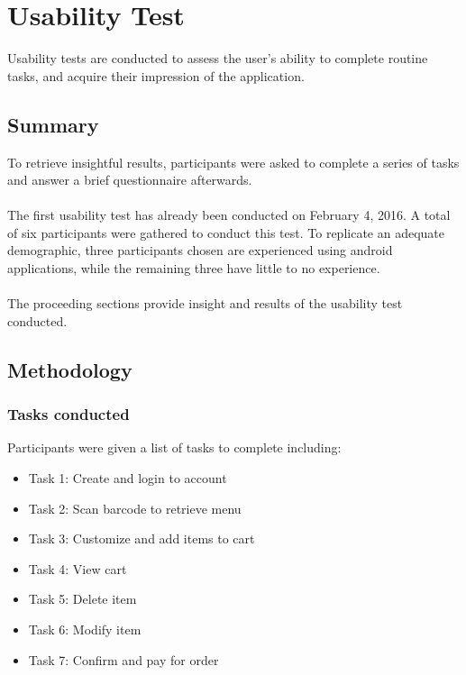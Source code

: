 \documentclass[12pt, titlepage]{article}
\begin{document}
\section{Usability Test}
\label{sec:Usability}
Usability tests are conducted to assess the user's ability to complete routine tasks, and acquire their impression of the application.
\subsection{Summary}

To retrieve insightful results, participants were asked to complete a series of tasks and answer a brief questionnaire afterwards. 
\\\\
The first usability test has already been conducted on February 4, 2016. A total of six participants were gathered to conduct this test. To replicate an adequate demographic, three participants chosen are experienced using android applications, while the remaining three have little to no experience. 
\\\\
The proceeding sections provide insight and results of the usability test conducted. 

\subsection{Methodology}

\subsubsection{Tasks conducted}
Participants were given a list of tasks to complete including: 
\begin{itemize}  
\item Task 1: Create and login to account
\item Task 2: Scan barcode to retrieve menu
\item Task 3: Customize and add items to cart
\item Task 4: View cart
\item Task 5: Delete item
\item Task 6: Modify item
\item Task 7: Confirm and pay for order
\end{itemize}
\end{document}

